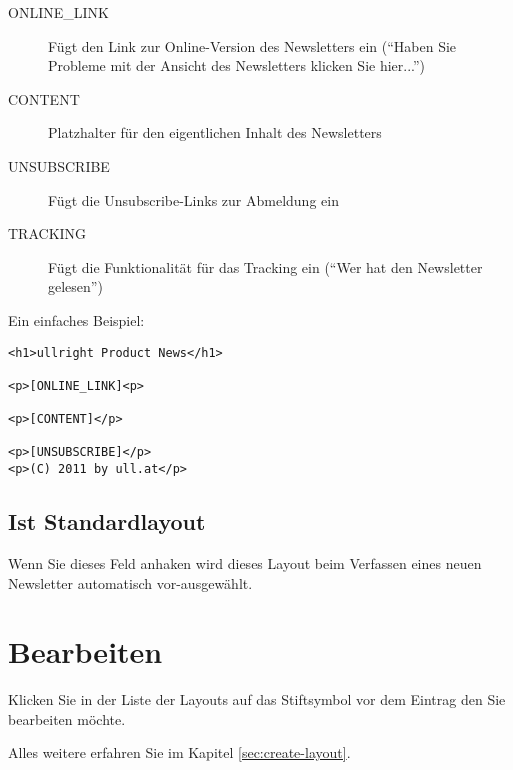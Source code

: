 \documentclass[article, a4paper, oneside, 11pt]{memoir}
\begin{document}
\begin{description}
 \item[\lbrack ONLINE\_LINK\rbrack] Fügt den Link zur Online-Version des Newsletters ein ("`Haben Sie Probleme mit der Ansicht des Newsletters klicken Sie hier..."')
 \item[\lbrack CONTENT\rbrack] Platzhalter für den eigentlichen Inhalt des Newsletters
 \item[\lbrack UNSUBSCRIBE\rbrack] Fügt die Unsubscribe-Links zur Abmeldung ein
 \item[\lbrack TRACKING\rbrack] Fügt die Funktionalität für das Tracking ein ("`Wer hat den Newsletter gelesen"')
\end{description}


Ein einfaches Beispiel:

\begin{lstlisting}
<h1>ullright Product News</h1>

<p>[ONLINE_LINK]<p>

<p>[CONTENT]</p>

<p>[UNSUBSCRIBE]</p>
<p>(C) 2011 by ull.at</p>
\end{lstlisting}

\subsection{Ist Standardlayout}

Wenn Sie dieses Feld anhaken wird dieses Layout beim Verfassen eines neuen Newsletter automatisch vor-ausgewählt.

\section{Bearbeiten}

Klicken Sie in der Liste der Layouts auf das Stiftsymbol vor dem Eintrag den Sie bearbeiten möchte.

Alles weitere erfahren Sie im Kapitel \vref{sec:create-layout}.
\end{document}
